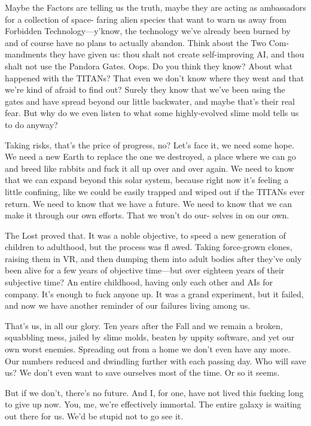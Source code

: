 Maybe the Factors are telling us the truth, maybe they 
are acting as ambassadors for a collection of space-
faring alien species that want to warn us away from 
Forbidden Technology—y'know, the technology we've 
already been burned by and of course have no plans 
to actually abandon. Think about the Two Com-
mandments they have given us: thou shalt not create 
self-improving AI, and thou shalt not use the Pandora 
Gates. Oops. Do you think they know? About what 
happened with the TITANs? That even we don't know 
where they went and that we're kind of afraid to find 
out? Surely they know that we've been using the gates 
and have spread beyond our little backwater, and 
maybe that's their real fear. But why do we even listen 
to what some highly-evolved slime mold tells us to 
do anyway?

Taking risks, that's the price of progress, no? Let's 
face it, we need some hope. We need a new Earth to 
replace the one we destroyed, a place where we can go 
and breed like rabbits and fuck it all up over and over 
again. We need to know that we can expand beyond 
this solar system, because right now it's feeling a little 
confining, like we could be easily trapped and wiped 
out if the TITANs ever return. We need to know that 
we have a future. We need to know that we can make 
it through our own efforts. That we won't do our-
selves in on our own.

The Lost proved that. It was a noble objective, to 
speed a new generation of children to adulthood, but 
the process was fl awed. Taking force-grown clones, 
raising them in VR, and then dumping them into adult 
bodies after they've only been alive for a few years 
of objective time—but over eighteen years of their 
subjective time? An entire childhood, having only 
each other and AIs for company. It's enough to fuck 
anyone up. It was a grand experiment, but it failed, 
and now we have another reminder of our failures 
living among us.

That's us, in all our glory. Ten years after the Fall 
and we remain a broken, squabbling mess, jailed by 
slime molds, beaten by uppity software, and yet our 
own worst enemies. Spreading out from a home we 
don't even have any more. Our numbers reduced and 
dwindling further with each passing day. Who will 
save us? We don't even want to save ourselves most of 
the time. Or so it seems.

But if we don't, there's no future. And I, for one, 
have not lived this fucking long to give up now. You, 
me, we're effectively immortal. The entire galaxy is 
waiting out there for us. We'd be stupid not to go 
see it.

